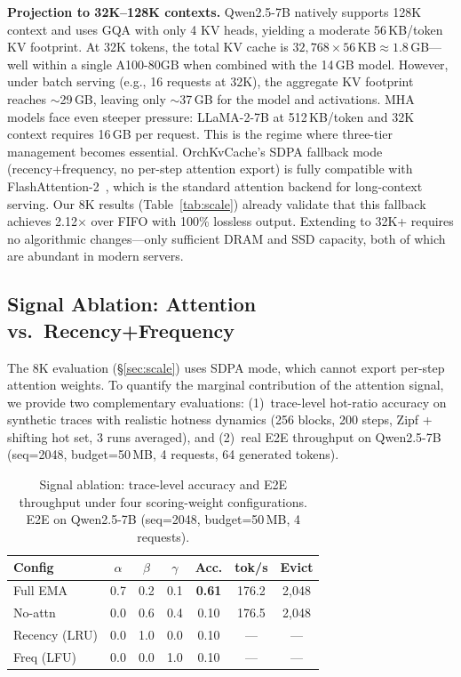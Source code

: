 \documentclass[conference]{IEEEtran}
\begin{document}
\textbf{Projection to 32K--128K contexts.} Qwen2.5-7B natively supports 128K context and uses GQA with only 4 KV heads, yielding a moderate 56\,KB/token KV footprint. At 32K tokens, the total KV cache is $32{,}768 \times 56\,\text{KB} \approx 1.8$\,GB---well within a single A100-80GB when combined with the 14\,GB model. However, under batch serving (e.g., 16 requests at 32K), the aggregate KV footprint reaches ${\sim}$29\,GB, leaving only ${\sim}$37\,GB for the model and activations. MHA models face even steeper pressure: LLaMA-2-7B at 512\,KB/token and 32K context requires 16\,GB per request. This is the regime where three-tier management becomes essential. OrchKvCache's SDPA fallback mode (recency+frequency, no per-step attention export) is fully compatible with FlashAttention-2~\cite{flashattn2}, which is the standard attention backend for long-context serving. Our 8K results (Table~\ref{tab:scale}) already validate that this fallback achieves 2.12$\times$ over FIFO with 100\% lossless output. Extending to 32K+ requires no algorithmic changes---only sufficient DRAM and SSD capacity, both of which are abundant in modern servers.

\subsection{Signal Ablation: Attention vs.\ Recency+Frequency}
\label{sec:signal-ablation}

The 8K evaluation (\S\ref{sec:scale}) uses SDPA mode, which cannot export per-step attention weights. To quantify the marginal contribution of the attention signal, we provide two complementary evaluations: (1)~trace-level hot-ratio accuracy on synthetic traces with realistic hotness dynamics (256 blocks, 200 steps, Zipf + shifting hot set, 3 runs averaged), and (2)~real E2E throughput on Qwen2.5-7B (seq=2048, budget=50\,MB, 4 requests, 64 generated tokens).

\begin{table}[t]
\centering
\caption{Signal ablation: trace-level accuracy and E2E throughput under four scoring-weight configurations. E2E on Qwen2.5-7B (seq=2048, budget=50\,MB, 4 requests).}
\label{tab:signal-ablation}
\small
\setlength{\tabcolsep}{6pt}
\begin{tabular}{@{}lcccccc@{}}
\toprule
Config & $\alpha$ & $\beta$ & $\gamma$ & Acc. & tok/s & Evict \\
\midrule
Full EMA       & 0.7 & 0.2 & 0.1 & \textbf{0.61} & 176.2 & 2{,}048 \\
No-attn        & 0.0 & 0.6 & 0.4 & 0.10 & 176.5 & 2{,}048 \\
Recency (LRU)  & 0.0 & 1.0 & 0.0 & 0.10 & --- & --- \\
Freq (LFU)     & 0.0 & 0.0 & 1.0 & 0.10 & --- & --- \\
\bottomrule
\end{tabular}
\end{table}
\end{document}
